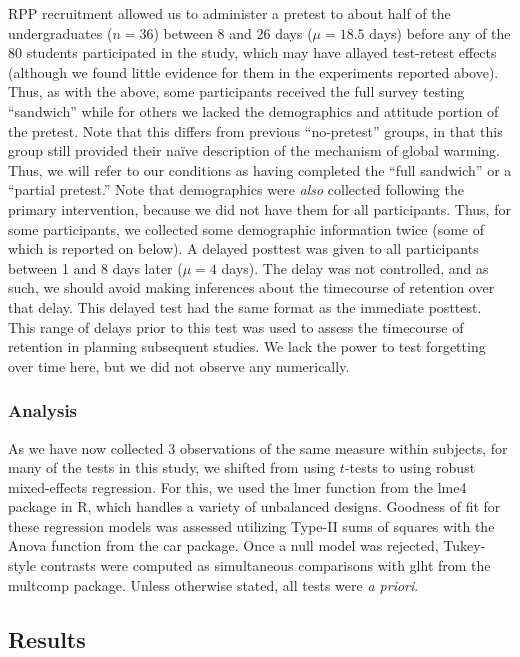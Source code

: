 RPP recruitment allowed us to administer a pretest to about half of the
undergraduates ($n=36$) between 8 and 26 days ($\mu=18.5$ days) before any of
the 80 students participated in the study, which may have allayed test-retest
effects (although we found little evidence for them in the experiments reported
above).  Thus, as with the above, some participants received the full survey
testing ``sandwich'' while for others we lacked the demographics and attitude
portion of the pretest. Note that this differs from previous “no-pretest”
groups, in that this group still provided their naïve description of the
mechanism of global warming. Thus, we will refer to our conditions as having
completed the  “full sandwich” or a “partial pretest.” Note that demographics
were \emph{also} collected following the primary intervention, because we did
not have them for all participants. Thus, for some participants, we collected
some demographic information twice (some of which is reported on below).
A delayed posttest was given to all participants between 1 and 8 days later
($\mu=4$ days). The delay was not controlled, and as such, we should avoid
making inferences about the timecourse of retention over that delay. This
delayed test had the same format as the immediate posttest.  This range of
delays prior to this test was used to assess the timecourse of retention in
planning subsequent studies. We lack the power to test forgetting over time
here, but we did not observe any numerically.

\subsubsection{Analysis}

As we have now collected 3 observations of the same measure within subjects, for
many of the tests in this study, we shifted from using $t$-tests to using robust
mixed-effects regression. For this, we used the \textsf{lmer} function from the
\textsf{lme4} package in R, which handles a variety of unbalanced designs.
Goodness of fit for these regression models was assessed utilizing Type-II
sums of squares with the \textsf{Anova} function from the \textsf{car} package.
Once a null model was rejected, Tukey-style contrasts were computed as
simultaneous comparisons with \textsf{glht} from the \textsf{multcomp} package.
Unless otherwise stated, all tests were \emph{a priori}.

\subsection{Results} 
\label{sec:uc-online-results}

